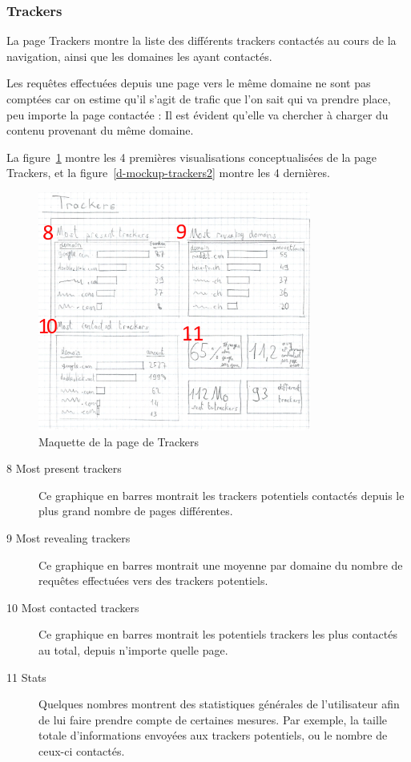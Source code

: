 		\FloatBarrier

		\subsubsection{Trackers}

			La page Trackers montre la liste des différents trackers contactés au cours de la navigation, ainsi que les domaines les ayant contactés.

			Les requêtes effectuées depuis une page vers le même domaine ne sont pas comptées car on estime qu'il s'agit de trafic que l'on sait qui va prendre place, peu importe la page contactée : Il est évident qu'elle va chercher à charger du contenu provenant du même domaine.
			
			La figure~\ref{d-mockup-trackers1} montre les 4 premières visualisations conceptualisées de la page Trackers, et la figure~\ref{d-mockup-trackers2} montre les 4 dernières.

			\begin{figure}[!h]
				\centering
				\includegraphics[width=0.8\textwidth]{images/design/mockup_trackers1}
				\caption{Maquette de la page de Trackers}
				\label{d-mockup-trackers1}
			\end{figure}

			\begin{description}
				\item[8 Most present trackers] Ce graphique en barres montrait les trackers potentiels contactés depuis  le plus grand nombre de pages différentes.
				\item[9 Most revealing trackers] Ce graphique en barres montrait une moyenne par domaine du nombre de requêtes effectuées vers des trackers potentiels.
				\item[10 Most contacted trackers] Ce graphique en barres montrait les potentiels trackers les plus contactés au total, depuis n'importe quelle page.
				\item[11 Stats] Quelques nombres montrent des statistiques générales de l'utilisateur afin de lui faire prendre compte de certaines mesures. Par exemple, la taille totale d'informations envoyées aux trackers potentiels, ou le nombre de ceux-ci contactés.
			\end{description}

